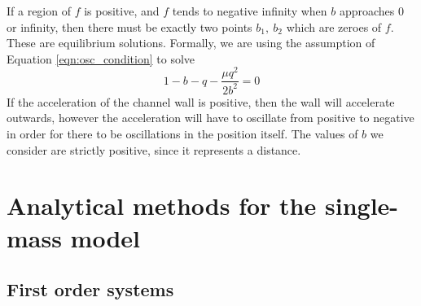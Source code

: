 \documentclass{report}
\begin{document}
If a region of $f$ is positive, and $f$ tends to negative infinity when $b$ approaches $0$ or infinity,
then there must be exactly two points $b_1,~b_2$ which are zeroes of $f$.
These are equilibrium solutions.
Formally, we are using the assumption of Equation \ref{eqn:osc_condition} to solve
\begin{equation}
    1 - b - q - \frac{\mu q^2}{2b^2} = 0
\end{equation}
If the acceleration of the channel wall is positive,
then the wall will accelerate outwards,
however the acceleration will have to oscillate from positive to negative in order for there to be oscillations in the position itself.
The values of $b$ we consider are strictly positive,
since it represents a distance.


\section{Analytical methods for the single-mass model}



\subsection{First order systems}

\end{document}
